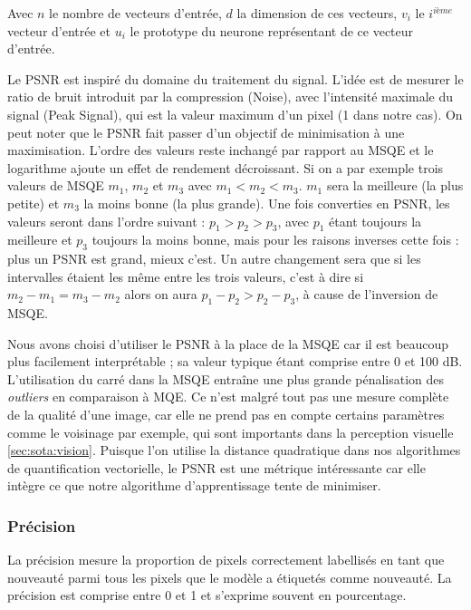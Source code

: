 	Avec $n$ le nombre de vecteurs d'entrée, $d$ la dimension de ces vecteurs, $v_i$ le $i^{\textit{ième}}$ vecteur d'entrée et $u_i$ le prototype du neurone représentant de ce vecteur d'entrée.

	Le PSNR est inspiré du domaine du traitement du signal. L'idée est de mesurer le ratio de bruit introduit par la compression (Noise), avec l'intensité maximale du signal (Peak Signal), qui est la valeur maximum d'un pixel (1 dans notre cas). On peut noter que le PSNR fait passer d'un objectif de minimisation à une maximisation. L'ordre des valeurs reste inchangé par rapport au MSQE et le logarithme ajoute un effet de rendement décroissant. Si on a par exemple trois valeurs de MSQE $m_1$, $m_2$ et $m_3$ avec $m_1 < m_2 < m_3$. $m_1$ sera la meilleure (la plus petite) et $m_3$ la moins bonne (la plus grande). Une fois converties en PSNR, les valeurs seront dans l'ordre suivant : $p_1 > p_2 > p_3$, avec $p_1$ étant toujours la meilleure et $p_3$ toujours la moins bonne, mais pour les raisons inverses cette fois : plus un PSNR est grand, mieux c'est. Un autre changement sera que si les intervalles étaient les même entre les trois valeurs, c'est à dire si $m_2 - m_1 = m_3 - m_2$ alors on aura $p_1 - p_2 > p_2 - p_3$, à cause de l'inversion de MSQE.

	Nous avons choisi d'utiliser le PSNR à la place de la MSQE car il est beaucoup plus facilement interprétable ; sa valeur typique étant comprise entre 0 et 100 dB. L'utilisation du carré dans la MSQE entraîne une plus grande pénalisation des \textit{outliers} en comparaison à MQE. Ce n'est malgré tout pas une mesure complète de la qualité d'une image, car elle ne prend pas en compte certains paramètres comme le voisinage par exemple, qui sont importants dans la perception visuelle \ref{sec:sota:vision}. Puisque l'on utilise la distance quadratique dans nos algorithmes de quantification vectorielle, le PSNR est une métrique intéressante car elle intègre ce que notre algorithme d'apprentissage tente de minimiser.
	
	\subsubsection{Précision}

	La précision mesure la proportion de pixels correctement labellisés en tant que nouveauté parmi tous les pixels que le modèle a étiquetés comme nouveauté. La précision est comprise entre 0 et 1 et s'exprime souvent en pourcentage.
	
